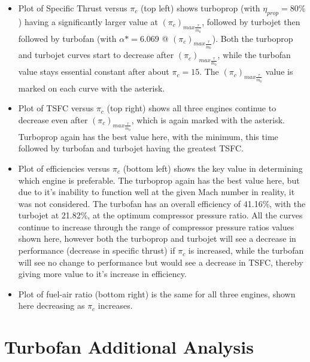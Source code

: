 \documentclass[]{aiaa-tc}%
\begin{document}
\begin{itemize}
	\item Plot of Specific Thrust versus $\pi_{c}$ (top left) shows turboprop (with $\eta_{prop}=80\%$) having a significantly larger value at $(\pi_{c})_{max\frac{\tau}{\dot{m}_{0}}}$, followed by turbojet then followed by turbofan (with $\alpha* = 6.069$ @ $(\pi_{c})_{max\frac{\tau}{\dot{m}_{0}}}$).  Both the turboprop and turbojet curves start to decrease after $(\pi_{c})_{max\frac{\tau}{\dot{m}_{0}}}$, while the turbofan value stays essential constant after about $\pi_{c}=15$.  The $(\pi_{c})_{max\frac{\tau}{\dot{m}_{0}}}$ value is marked on each curve with the asterisk.

	\item Plot of TSFC versus $\pi_{c}$ (top right) shows all three engines continue to decrease even after $(\pi_{c})_{max\frac{\tau}{\dot{m}_{0}}}$, which is again marked with the asterisk.  Turboprop again has the best value here, with the minimum, this time followed by turbofan and turbojet having the greatest TSFC.

	\item Plot of efficiencies versus $\pi_{c}$ (bottom left) shows the key value in determining which engine is preferable.  The turboprop again has the best value here, but due to it's inability to function well at the given Mach number in reality, it was not considered.  The turbofan has an overall efficiency of 41.16\%, with the turbojet at 21.82\%, at the optimum compressor pressure ratio.  All the curves continue to increase through the range of compressor pressure ratios values shown here, however both the turboprop and turbojet will see a decrease in performance (decrease in specific thrust) if $\pi_{c}$ is increased, while the turbofan will see no change to performance but would see a decrease in TSFC, thereby giving more value to it's increase in efficiency.

	\item Plot of fuel-air ratio (bottom right) is the same for all three engines, shown here decreasing as $\pi_{c}$ increases.

\end{itemize}

\section{Turbofan Additional Analysis}
\end{document}

